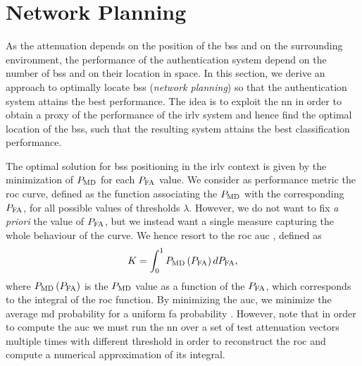 \documentclass[conference,draftcls,onecolumn]{IEEEtran}
\begin{document}


\section{Network Planning}\label{sec:bsPos}

As the attenuation depends on the position of the \acp{bs} and on the surrounding environment, the performance of the authentication system depend on the number of \acp{bs} and on their location in space. In this section, we derive an approach to optimally locate \acp{bs} (\emph{network planning}) so that the authentication system attains the best performance. 
The idea is to exploit the \ac{nn} in order to obtain a proxy of the performance of the \ac{irlv} system and hence find the optimal location of the \acp{bs}, such that the resulting system attains the best classification performance.

The optimal solution for \acp{bs} positioning in the \ac{irlv} context is given by the minimization of $P_{\rm MD}$ for each $P_{\rm FA}$ value. We consider as performance metric the \ac{roc} curve, defined as the  function associating the $P_{\rm MD}$ with the corresponding $P_{\rm FA}$, for all possible values of thresholds $\lambda$. However, we do not want to fix {\em a priori} the value of $P_{\rm FA}$, but we instead want a single measure capturing the whole behaviour of the curve. We hence resort to the \ac{roc} \ac{auc} \cite{hanley-82}, defined as 
\begin{equation}
    K  = \int_{0}^{1} P_{\rm MD}\left(P_{\rm FA}\right) d P_{\rm FA},
\end{equation}
where $P_{\rm MD}\left(P_{\rm FA}\right)$ is the $P_{\rm MD}$ value as a function of the $P_{\rm FA}$, which corresponds to the integral of the \ac{roc} function. By minimizing the \ac{auc}, we minimize the average \ac{md} probability for a uniform \ac{fa} probability
. However, note that in order to compute the \ac{auc} we must run the \ac{nn} over a set of test attenuation vectors multiple times with different threshold in order to reconstruct the \ac{roc} and compute a numerical approximation of its integral.
\end{document}
